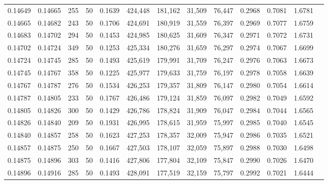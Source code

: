 \begin{tabular}{rrrrrrrrrrrrr}
0.14649 & 0.14665 &   255 &  50 &                                     0.1639 & 424,448 & 181,162 &  31,509 &  76,447 & 0.2968 & 0.7081 & 1.6781 \\
0.14665 & 0.14682 &   243 &  50 &                                     0.1706 & 424,691 & 180,919 &  31,559 &  76,397 & 0.2969 & 0.7077 & 1.6759 \\
0.14683 & 0.14702 &   294 &  50 &                                     0.1453 & 424,985 & 180,625 &  31,609 &  76,347 & 0.2971 & 0.7072 & 1.6731 \\
0.14702 & 0.14724 &   349 &  50 &                                     0.1253 & 425,334 & 180,276 &  31,659 &  76,297 & 0.2974 & 0.7067 & 1.6699 \\
0.14724 & 0.14745 &   285 &  50 &                                     0.1493 & 425,619 & 179,991 &  31,709 &  76,247 & 0.2976 & 0.7063 & 1.6673 \\
0.14745 & 0.14767 &   358 &  50 &                                     0.1225 & 425,977 & 179,633 &  31,759 &  76,197 & 0.2978 & 0.7058 & 1.6639 \\
0.14767 & 0.14787 &   276 &  50 &                                     0.1534 & 426,253 & 179,357 &  31,809 &  76,147 & 0.2980 & 0.7054 & 1.6614 \\
0.14787 & 0.14805 &   233 &  50 &                                     0.1767 & 426,486 & 179,124 &  31,859 &  76,097 & 0.2982 & 0.7049 & 1.6592 \\
0.14805 & 0.14826 &   300 &  50 &                                     0.1429 & 426,786 & 178,824 &  31,909 &  76,047 & 0.2984 & 0.7044 & 1.6565 \\
0.14826 & 0.14840 &   209 &  50 &                                     0.1931 & 426,995 & 178,615 &  31,959 &  75,997 & 0.2985 & 0.7040 & 1.6545 \\
0.14840 & 0.14857 &   258 &  50 &                                     0.1623 & 427,253 & 178,357 &  32,009 &  75,947 & 0.2986 & 0.7035 & 1.6521 \\
0.14857 & 0.14875 &   250 &  50 &                                     0.1667 & 427,503 & 178,107 &  32,059 &  75,897 & 0.2988 & 0.7030 & 1.6498 \\
0.14875 & 0.14896 &   303 &  50 &                                     0.1416 & 427,806 & 177,804 &  32,109 &  75,847 & 0.2990 & 0.7026 & 1.6470 \\
0.14896 & 0.14916 &   285 &  50 &                                     0.1493 & 428,091 & 177,519 &  32,159 &  75,797 & 0.2992 & 0.7021 & 1.6444 \\

\end{tabular}
